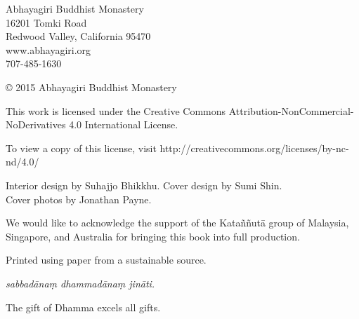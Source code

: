 \thispagestyle{empty}
{\footnotesize\raggedright
{}

\vspace{1em}
Abhayagiri Buddhist Monastery\\
16201 Tomki Road\\
Redwood Valley, California 95470\\
www.abhayagiri.org\\
707-485-1630

\vspace{1em}
\copyright{} 2015 Abhayagiri Buddhist Monastery

\vspace{1em}
This work is licensed under the Creative Commons
Attribution-NonCommercial-NoDerivatives 4.0 International License.

To view a copy of this license, visit
http://creativecommons.org/licenses/by-nc-nd/4.0/

\vspace{1em}

Interior design by Suhajjo Bhikkhu. Cover design by Sumi Shin.\\
Cover photos by Jonathan Payne. 


\vspace{1em}

We would like to acknowledge the support of the Kataññutā group of
Malaysia, Singapore, and Australia for bringing this book into full
production.

\vspace{1em}

Printed using paper from a sustainable source.

\vspace{1em}

\textit{sabbadānaṃ dhammadānaṃ jināti.}

The gift of Dhamma excels all gifts.
}

\clearpage
